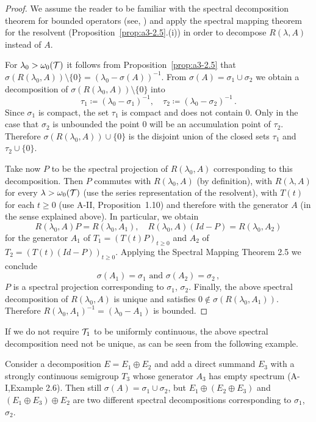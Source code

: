 \begin{proof}
We assume the reader to be familiar with the spectral decomposition theorem for bounded operators (see, \eg \citet[p.572]{dunfordschwartz:1958}) and apply the spectral mapping theorem for the resolvent (Proposition~\ref{prop:a3-2.5}.(i)) in order to decompose $R(\lambda,A)$ instead of $A$.

For $\lambda_{0} > \omega_{0}(\mathcal{T})$ it follows from Proposition~\ref{prop:a3-2.5} that $\sigma(R(\lambda_{0},A)) \setminus \{0\} = (\lambda_{0} - \sigma(A))^{-1}$.
From $\sigma(A) = \sigma_{1} \cup \sigma_{2}$ we obtain a decomposition of $\sigma(R(\lambda_{0},A)) \setminus \{0\}$ into
\[
\tau_{1} \coloneqq (\lambda_{0}-\sigma_{1})^{-1}, \quad \tau_{2} \coloneqq (\lambda_{0}-\sigma_{2})^{-1}\,.
\]
Since $\sigma_{1}$ is compact, the set $\tau_{1}$ is compact and does not contain $0$.
Only in the case that $\sigma_{2}$ is unbounded the point $0$ will be an accumulation point of $\tau_{2}$.
Therefore $\sigma(R(\lambda_{0},A)) \cup \{0\}$ is the disjoint union of the closed sets $\tau_{1}$ and $\tau_{2} \cup \{0\}$.

Take now $P$ to be the spectral projection of $R(\lambda_{0},A)$ corresponding to this decomposition.
Then $P$ commutes with $R(\lambda_{0},A)$ (by definition), with $R(\lambda,A)$ for every $\lambda > \omega_{0}(\mathcal{T})$ (use the series representation of the resolvent), with $T(t)$ for each $t \geq 0$ (use A-II, Proposition~1.10) and therefore with the generator $A$ (in the sense explained above).
In particular, we obtain
\[
R(\lambda_{0},A)P = R(\lambda_{0},A_{1}), \quad R(\lambda_{0},A)(Id-P) = R(\lambda_{0},A_{2})
\]
for the generator $A_{1}$ of $T_{1} = (T(t)P)_{t \geq 0}$ and $A_{2}$ of $T_{2} = (T(t)(Id-P))_{t \geq 0}$.
Applying the Spectral Mapping Theorem 2.5 we conclude
\[
\sigma(A_{1}) = \sigma_{1} \text{ and } \sigma(A_{2}) = \sigma_{2}\,,
\]
\ie $P$ is a spectral projection corresponding to $\sigma_{1}$, $\sigma_{2}$.
Finally, the above spectral decomposition of $R(\lambda_{0},A)$ is unique and satisfies $0 \notin \sigma(R(\lambda_{0},A_{1}))$.
Therefore $R(\lambda_{0},A_{1})^{-1} = (\lambda_{0}-A_{1})$ is bounded.
\end{proof}
If we do not require $\mathcal{T}_{1}$ to be uniformly continuous, the above spectral decomposition need not be unique, as can be seen from the following example. 

Consider a decomposition $E = E_{1} \oplus E_{2}$ and add a direct summand $E_{3}$ with a strongly continuous semigroup $T_{3}$ whose generator $A_{3}$ has empty spectrum (\eg A-I,Example 2.6).
Then still $\sigma(A) = \sigma_{1} \cup \sigma_{2}$, but $E_{1} \oplus (E_{2} \oplus E_{3})$ and $(E_{1} \oplus E_{3}) \oplus E_{2}$ are two different spectral decompositions corresponding to $\sigma_{1}$, $\sigma_{2}$.

